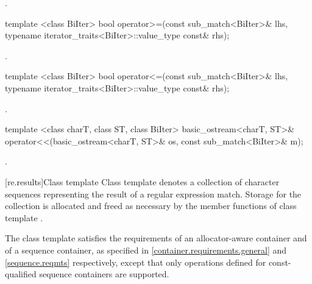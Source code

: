 \begin{itemdescr}
\pnum
\returns {}.
\end{itemdescr}

%
%
\begin{itemdecl}
template <class BiIter> 
  bool operator>=(const sub_match<BiIter>& lhs, 
                  typename iterator_traits<BiIter>::value_type const& rhs); 
\end{itemdecl}

\begin{itemdescr}
\pnum
\returns {}.
\end{itemdescr}

%
%
\begin{itemdecl}
template <class BiIter> 
  bool operator<=(const sub_match<BiIter>& lhs, 
                  typename iterator_traits<BiIter>::value_type const& rhs); 
\end{itemdecl}

\begin{itemdescr}
\pnum
\returns {}.
\end{itemdescr}

%
%
%
\begin{itemdecl}
template <class charT, class ST, class BiIter>
  basic_ostream<charT, ST>&
  operator<<(basic_ostream<charT, ST>& os, const sub_match<BiIter>& m); 
\end{itemdecl}

\begin{itemdescr}
\pnum\returns  {}.
\end{itemdescr}

[re.results]{Class template }
\pnum
{}%
Class template  denotes a collection of character
sequences representing the result of a regular expression
match. Storage for the collection is allocated and freed as necessary
by the member functions of class template .

\pnum
{}%
%
%
The class template  satisfies the requirements of an
allocator-aware container and of a sequence container, as specified
in \ref{container.requirements.general} and \ref{sequence.reqmts} respectively,
except that only operations defined for const-qualified
sequence containers are supported.


